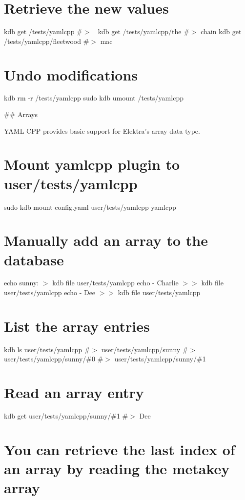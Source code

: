 \section*{Retrieve the new values}

kdb get /tests/yamlcpp \#$>$ 🎵 kdb get /tests/yamlcpp/the \#$>$ chain kdb get /tests/yamlcpp/fleetwood \#$>$ mac

\section*{Undo modifications}

kdb rm -\/r /tests/yamlcpp sudo kdb umount /tests/yamlcpp 
\begin{DoxyCode}
## Arrays

YAML CPP provides basic support for Elektra’s array data type.
\end{DoxyCode}
 \section*{Mount yamlcpp plugin to {\ttfamily user/tests/yamlcpp}}

sudo kdb mount config.\+yaml user/tests/yamlcpp yamlcpp

\section*{Manually add an array to the database}

echo \textquotesingle{}sunny\+:\textquotesingle{} $>$ {\ttfamily kdb file user/tests/yamlcpp} echo \textquotesingle{} -\/ Charlie\textquotesingle{} $>$$>$ {\ttfamily kdb file user/tests/yamlcpp} echo \textquotesingle{} -\/ Dee\textquotesingle{} $>$$>$ {\ttfamily kdb file user/tests/yamlcpp}

\section*{List the array entries}

kdb ls user/tests/yamlcpp \#$>$ user/tests/yamlcpp/sunny \#$>$ user/tests/yamlcpp/sunny/\#0 \#$>$ user/tests/yamlcpp/sunny/\#1

\section*{Read an array entry}

kdb get user/tests/yamlcpp/sunny/\#1 \#$>$ Dee

\section*{You can retrieve the last index of an array by reading the metakey {\ttfamily array}}

